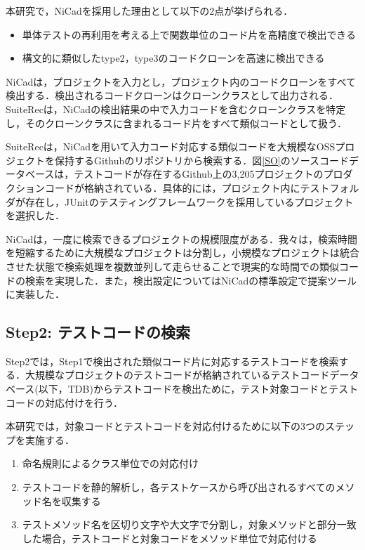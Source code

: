 \documentclass[12pt]{jarticle} %
\begin{document}
本研究で，{\sf NiCad}を採用した理由として以下の2点が挙げられる．

\begin{itemize}
\item 単体テストの再利用を考える上で関数単位のコード片を高精度で検出できる
\item 構文的に類似したtype2，type3のコードクローンを高速に検出できる
\end{itemize}


{\sf NiCad}は，プロジェクトを入力とし，プロジェクト内のコードクローンをすべて検出する．検出されるコードクローンはクローンクラスとして出力される．{\sf SuiteRec}は，{\sf NiCad}の検出結果の中で入力コードを含むクローンクラスを特定し，そのクローンクラスに含まれるコード片をすべて類似コードとして扱う．

{\sf SuiteRec}は，{\sf NiCad}を用いて入力コード対応する類似コードを大規模なOSSプロジェクトを保持するGithubのリポジトリから検索する．図\ref{SO}のソースコードデータベースは，テストコードが存在するGithub上の3,205プロジェクトのプロダクションコードが格納されている．具体的には，プロジェクト内にテストフォルダが存在し，JUnitのテスティングフレームワークを採用しているプロジェクトを選択した．

{\sf NiCad}は，一度に検索できるプロジェクトの規模限度がある．我々は，検索時間を短縮するために大規模なプロジェクトは分割し，小規模なプロジェクトは統合させた状態で検索処理を複数並列して走らせることで現実的な時間での類似コードの検索を実現した．また，検出設定については{\sf NiCad}の標準設定で提案ツールに実装した．

\subsection{Step2: テストコードの検索}
Step2では，Step1で検出された類似コード片に対応するテストコードを検索する．大規模なプロジェクトのテストコードが格納されているテストコードデータベース(以下，TDB)からテストコードを検出ために，テスト対象コードとテストコードの対応付けを行う．

本研究では，対象コードとテストコードを対応付けるために以下の3つのステップを実施する．

\begin{enumerate}
  \item 命名規則によるクラス単位での対応付け
  \item テストコードを静的解析し，各テストケースから呼び出されるすべてのメソッド名を収集する
  \item テストメソッド名を区切り文字や大文字で分割し，対象メソッドと部分一致した場合，テストコードと対象コードをメソッド単位で対応付ける
\end{enumerate}
\end{document}
